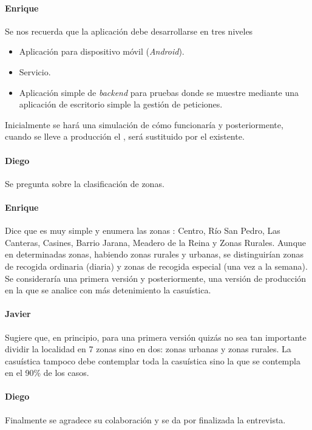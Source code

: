 \paragraph{Enrique} Se nos recuerda que la aplicación debe desarrollarse en tres niveles
\begin{itemize}
\item Aplicación para dispositivo móvil (\textit{Android}).
\item  Servicio.
\item Aplicación simple de \textit{backend} para pruebas donde se muestre mediante una aplicación de escritorio simple la gestión de peticiones.
\end{itemize}
Inicialmente se hará una simulación de cómo funcionaría y posteriormente, cuando se lleve a producción el , será sustituido por el existente.
 
\paragraph{Diego} Se pregunta sobre la clasificación de zonas.
 
\paragraph{Enrique} Dice que es muy simple y enumera las zonas : Centro, Río San Pedro, Las Canteras, Casines, Barrio Jarana, Meadero de la Reina y Zonas Rurales. Aunque en determinadas zonas, habiendo zonas rurales y urbanas, se distinguirían zonas de recogida ordinaria (diaria) y zonas de recogida especial (una vez a la semana). Se consideraría una primera versión y posteriormente, una versión de producción en la que se analice con más detenimiento la casuística.
 
\paragraph{Javier} Sugiere que, en principio, para una primera versión quizás no sea tan importante dividir la localidad en 7 zonas sino en dos: zonas urbanas y zonas rurales. La casuística tampoco debe contemplar toda la casuística sino la que se contempla en el 90\% de los casos.

\paragraph{Diego}Finalmente se agradece su colaboración y se da por finalizada la entrevista. 
